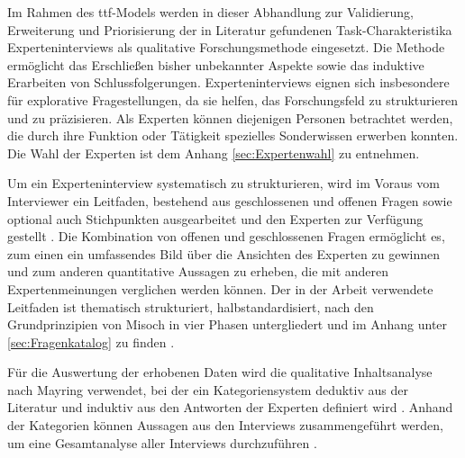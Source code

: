 Im Rahmen des \ac{ttf}-Models werden in dieser Abhandlung zur Validierung, Erweiterung und Priorisierung der in Literatur gefundenen Task-Charakteristika Experteninterviews als qualitative Forschungsmethode eingesetzt. Die Methode ermöglicht das Erschließen bisher unbekannter Aspekte sowie das induktive Erarbeiten von Schlussfolgerungen. Experteninterviews eignen sich insbesondere für explorative Fragestellungen, da sie helfen, das Forschungsfeld zu strukturieren und zu präzisieren. Als Experten können diejenigen Personen betrachtet werden, die durch ihre Funktion oder Tätigkeit spezielles Sonderwissen erwerben konnten. \autocite[Vgl.][S. 119-127]{MISOCH2019} Die Wahl der Experten ist dem Anhang \ref{sec:Expertenwahl} zu entnehmen.

Um ein Experteninterview systematisch zu strukturieren, wird im Voraus vom Interviewer ein Leitfaden, bestehend aus geschlossenen und offenen Fragen sowie optional auch Stichpunkten ausgearbeitet und den Experten zur Verfügung gestellt \autocite[Vgl.][S. 670]{HELFFERICH2019}. Die Kombination von offenen und geschlossenen Fragen ermöglicht es, zum einen ein umfassendes Bild über die Ansichten des Experten zu gewinnen und zum anderen quantitative Aussagen zu erheben, die mit anderen Expertenmeinungen verglichen werden können. Der in der Arbeit verwendete Leitfaden ist thematisch strukturiert, halbstandardisiert, nach den Grundprinzipien von Misoch in vier Phasen untergliedert und im Anhang unter \ref{sec:Fragenkatalog} zu finden \autocite[Vgl.][S. 68f]{MISOCH2019}.  

Für die Auswertung der erhobenen Daten wird die qualitative Inhaltsanalyse nach Mayring verwendet, bei der ein Kategoriensystem deduktiv aus der Literatur und induktiv aus den Antworten der Experten definiert wird \autocite[Vgl.][S. 633-634]{MAYRING2019}. Anhand der Kategorien können Aussagen aus den Interviews zusammengeführt werden, um eine Gesamtanalyse aller Interviews durchzuführen \autocite[Vgl.][S. 74]{BOGNER2014}. 



